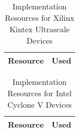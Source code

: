 \ifnum{}
\begin{table}[H]
  \begin{center}
    \begin{tabular}{|l|r|}
      \hline
%      
        
      \rowcolor{iob-green}
      \textbf{Resource}  & \textbf{Used} \\
      \hline
      \hline

       

    \end{tabular}
    \caption{Implementation Resources for Xilinx Kintex Ultrascale Devices}
    \label{tab:res-xil}
  \end{center}
\end{table}
\fi

\vspace{-0.5cm}

\ifnum{}
\begin{table}[H]
  \begin{center}
    \begin{tabular}{|l|r|}
      \hline

      \rowcolor{iob-green}
      \textbf{Resource}  & \textbf{Used} \\
      \hline
      \hline

       
        
    \end{tabular}
    \caption{Implementation Resources for Intel Cyclone V Devices}
    \label{tab:res-alt}
  \end{center}
\end{table}
\fi

\vspace{-1cm}

